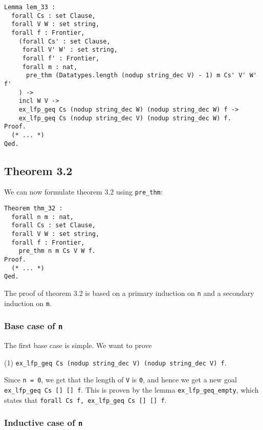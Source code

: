 \begin{minipage}{\linewidth}
\begin{lstlisting}[language=Coq, label={lst:lem_33}, caption={Lemma 3.3 in Coq}]
Lemma lem_33 :
  forall Cs : set Clause,
  forall V W : set string,
  forall f : Frontier,
    (forall Cs' : set Clause,
     forall V' W' : set string,
     forall f' : Frontier,
     forall m : nat,
      pre_thm (Datatypes.length (nodup string_dec V) - 1) m Cs' V' W' f'
    ) ->
    incl W V ->
    ex_lfp_geq Cs (nodup string_dec W) (nodup string_dec W) f ->
    ex_lfp_geq Cs (nodup string_dec V) (nodup string_dec W) f.
Proof.
  (* ... *)
Qed.
\end{lstlisting}
\end{minipage}

\subsection{Theorem 3.2}

We can now formulate theorem 3.2 using \lstinline{pre_thm}:

\begin{minipage}{\linewidth}
\begin{lstlisting}[language=Coq, label={lst:thm_32}, caption={Theorem 3.2 in Coq}]
Theorem thm_32 :
  forall n m : nat,
  forall Cs : set Clause,
  forall V W : set string,
  forall f : Frontier,
    pre_thm n m Cs V W f.
Proof.
  (* ... *)
Qed.
\end{lstlisting}
\end{minipage}

The proof of theorem 3.2 is based on a primary induction on \lstinline{n} and a secondary induction on \lstinline{m}.

\subsubsection{Base case of \lstinline{n}}

The first base case is simple. We want to prove

(1) \tabto{2em}
\lstinline{ex_lfp_geq Cs (nodup string_dec V) (nodup string_dec V) f}.

Since \lstinline{n = 0}, we get that the length of \lstinline{V} is \lstinline{0},
and hence we get a new goal \lstinline{ex_lfp_geq Cs [] [] f}.
This is proven by the lemma \lstinline{ex_lfp_geq_empty},
which states that \lstinline{forall Cs f, ex_lfp_geq Cs [] [] f}.

\subsubsection{Inductive case of \lstinline{n}}

